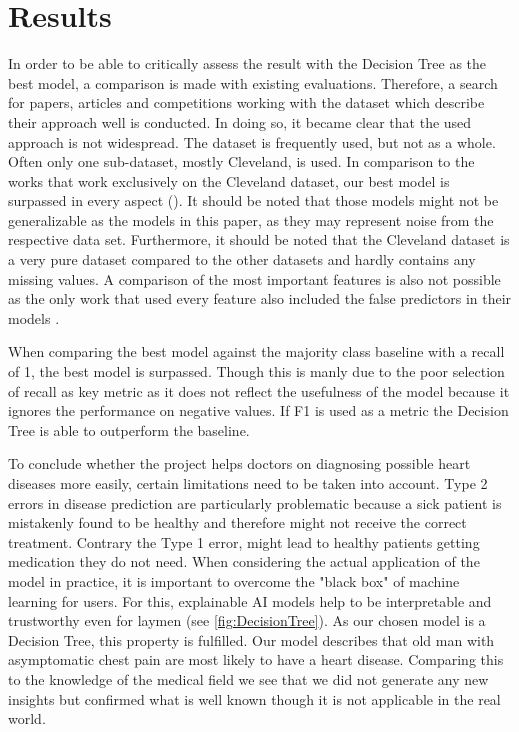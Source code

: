 
\section{Results} \label{sec:results}

In order to be able to critically assess the result with the Decision Tree as the best model, a comparison is made with existing evaluations. Therefore, a search for papers, articles and competitions working with the dataset which describe their approach well is conducted. In doing so,  it became clear that the used approach is not widespread. The dataset is frequently used, but not as a whole. Often only one sub-dataset, mostly Cleveland, is used.  In comparison to the works that work exclusively on the Cleveland dataset, our best model is surpassed in every aspect (\cite{ayatollahi2019,alotaibi2019, uyar2017}). It should be noted that those models might not be generalizable as the models in this paper, as they may represent noise from the respective data set. Furthermore, it should be noted that the Cleveland dataset is a very pure dataset compared to the other datasets and hardly contains any missing values. 
A comparison of the most important features is also not possible as the only work that used every feature also included the false predictors in their models \cite{garate-escamila2020}.

When comparing the best model against the majority class baseline with a recall of 1, the best model is surpassed. Though this is manly due to the poor selection of recall as key metric as it does not reflect the usefulness of the model because it ignores the performance on negative values. If F1 is used as a metric the Decision Tree is able to outperform the baseline.

To conclude whether the project helps doctors on diagnosing possible heart diseases more easily, certain limitations need to be taken into account. Type 2 errors in disease prediction are particularly problematic because a sick patient is mistakenly found to be healthy and therefore might not receive the correct treatment. Contrary the Type 1 error, might lead to healthy patients getting medication they do not need. When considering the actual application of the model in practice, it is important to overcome the "black box" of machine learning for users. For this, explainable AI models help to be interpretable and trustworthy even for laymen (see \cref{fig:DecisionTree}). As our chosen model is a Decision Tree, this property is fulfilled. Our model describes that old man with asymptomatic chest pain are most likely to have a heart disease. Comparing this to the knowledge of the medical field \citep{rodgers2019} we see that we did not generate any new insights but confirmed what is well known though it is not applicable in the real world.
